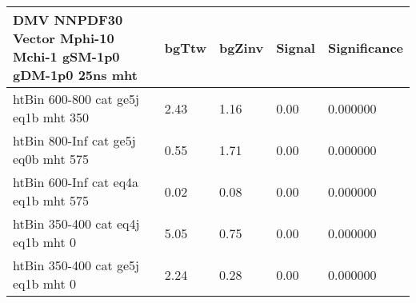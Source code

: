 \begin{tabular}{|l|l|l|l|l|}
\footnotesize
   \label{mostSensitiveBins_DMV_NNPDF30_Vector_Mphi-10_Mchi-1_gSM-1p0_gDM-1p0_25ns}
	\textbf{DMV NNPDF30 Vector Mphi-10 Mchi-1 gSM-1p0 gDM-1p0 25ns mht}	 & 	bgTtw	 & 	bgZinv	 & 	Signal &	 Significance \\ 
	\hline
	htBin 600-800 cat ge5j eq1b mht 350 & 	2.43	 & 	1.16	 & 	0.00 	&0.000000 \\ 
	htBin 800-Inf cat ge5j eq0b mht 575 & 	0.55	 & 	1.71	 & 	0.00 	&0.000000 \\ 
	htBin 600-Inf cat eq4a eq1b mht 575 & 	0.02	 & 	0.08	 & 	0.00 	&0.000000 \\ 
	htBin 350-400 cat eq4j eq1b mht 0 & 	5.05	 & 	0.75	 & 	0.00 	&0.000000 \\ 
	htBin 350-400 cat ge5j eq1b mht 0 & 	2.24	 & 	0.28	 & 	0.00 	&0.000000 \\ 
\end{tabular}
